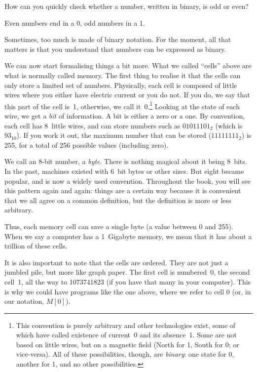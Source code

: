 \begin{exercise}
How can you quickly check whether a number, written in binary, is odd or even?
\begin{solution}
Even numbers end in a 0, odd numbers in a 1.
\end{solution}
\end{exercise}

Sometimes, too much is made of binary notation. For the moment, all that
matters is that you understand that numbers can be expressed as
binary.

We can now start formalising things a bit more. What we called ``cells'' above
are what is normally called memory. The first thing to realise it that the
cells can only store a limited set of numbers. Physically, each cell is
composed of little wires where you either have electric current or you do not.
If you do, we say that this part of the cell is~1, otherwise, we call
it~0.\footnote{This convention is purely arbitrary and other technologies
exist, some of which have called existence of current~0 and its absence~1. Some
are not based on little wires, but on a magnetic field (North for 1, South for
0; or vice-versa). All of these possibilities, though, are \emph{binary}: one
state for 0, another for 1, and no other possibilities.} Looking at the state
of each wire, we get a \emph{bit} of information. A bit is either a zero or a
one. By convention, each cell has 8~little wires, and can store numbers such as
$01011101_2$ (which is $93_{10}$). If you work it out, the maximum number that
can be stored ($11111111_2$) is 255, for a total of 256 possible values
(including zero).

We call an 8-bit number, a \emph{byte}. There is nothing magical about it being
8~bits. In the past, machines existed with 6~bit bytes or other sizes. But
eight became popular, and is now a widely used convention. Throughout the book,
you will see this pattern again and again: things are a certain way because it
is convenient that we all agree on a common definition, but the definition is
more or less arbitrary.

Thus, each memory cell can save a single byte (a value between 0 and 255). When
we say a computer has a 1~Gigabyte memory, we mean that it has about a trillion
of these cells.

It is also important to note that the cells are ordered. They are not just a
jumbled pile, but more like graph paper. The first cell is numbered~0, the
second cell~1, all the way to 1073741823 (if you have that many in your
computer). This is why we could have programs like the one above, where we
refer to cell 0 (or, in our notation, $M[0]$).

